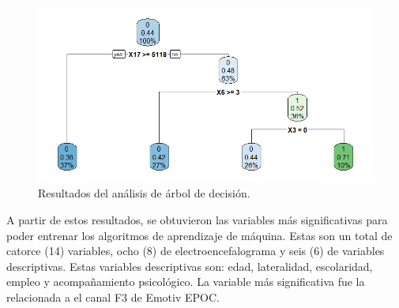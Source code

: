 \begin{figure}
    \centering
    \includegraphics[scale=0.65]{figuras/Rplot2.png}
    \caption{Resultados del análisis de árbol de decisión.}
    \label{fig:my_label}
\end{figure}
A partir de estos resultados, se obtuvieron las variables más significativas para poder entrenar los algoritmos de aprendizaje de máquina. Estas son un total de catorce (14) variables, ocho (8) de electroencefalograma y seis (6) de variables descriptivas. Estas variables descriptivas son: edad, lateralidad, escolaridad, empleo y acompañamiento psicológico. La variable más significativa fue la relacionada a el canal F3 de Emotiv EPOC.
